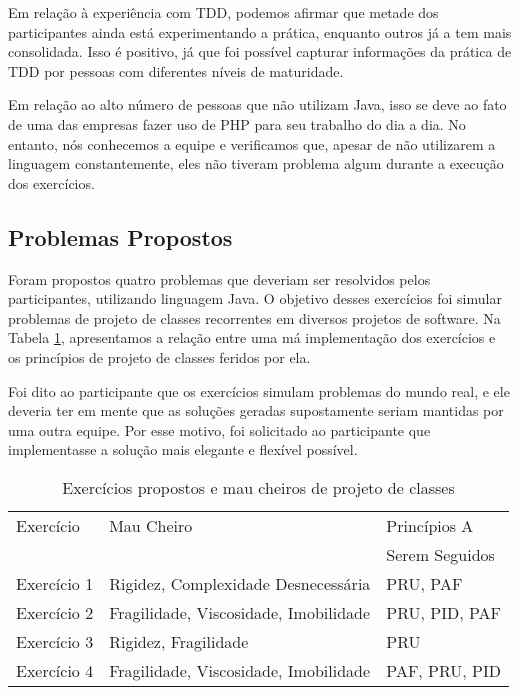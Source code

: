 \documentclass[conference]{IEEEtran}
\begin{document}
Em relação à experiência com TDD,
podemos afirmar que metade dos participantes ainda está experimentando a prática, enquanto
outros já a tem mais consolidada. Isso é positivo, já que foi possível capturar informações
da prática de TDD por pessoas com diferentes níveis de maturidade.

Em relação ao alto número de pessoas que não utilizam Java, isso se deve ao fato de uma das
empresas fazer uso de PHP para seu trabalho do dia a dia. No entanto, nós conhecemos a equipe
e verificamos que, apesar de não utilizarem a linguagem constantemente, eles não tiveram
problema algum durante a execução dos exercícios.

\subsection{Problemas Propostos}
\label{sec:exercicios}

Foram propostos quatro problemas que deveriam ser resolvidos pelos participantes, utilizando
linguagem Java. O objetivo desses exercícios foi simular problemas de projeto de classes 
recorrentes em diversos projetos de software. 
Na Tabela \ref{tab:problemas-exercicios}, apresentamos a relação entre uma má
implementação dos exercícios e os princípios de projeto de classes feridos por
ela.

Foi dito ao participante que os exercícios simulam problemas do mundo real, e ele deveria
ter em mente que as soluções geradas supostamente seriam mantidas por uma outra equipe.
Por esse motivo, foi solicitado ao participante que implementasse a solução mais elegante e flexível 
possível.

\begin{table}
	\centering
	\begin{tabular}{| l | l | l | }
		\hline
		Exercício & Mau Cheiro & Princípios A\\
		& & Serem Seguidos\\
		
		\hline
		
		Exercício 1 & Rigidez, Complexidade Desnecessária & PRU, PAF \\
		Exercício 2 & Fragilidade, Viscosidade, Imobilidade & PRU, PID, PAF \\
		Exercício 3 & Rigidez, Fragilidade & PRU\\
		Exercício 4 & Fragilidade, Viscosidade, Imobilidade & PAF, PRU, PID \\
		
		\hline
	\end{tabular}
	\caption{Exercícios propostos e mau cheiros de projeto de classes}
	\label{tab:problemas-exercicios}
\end{table}
\end{document}
